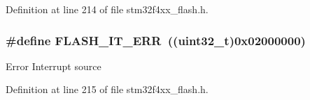 Definition at line 214 of file stm32f4xx\-\_\-flash.\-h.

\hypertarget{group___f_l_a_s_h___interrupts_ga4e2c23ab8c1b9a5ee49bf6d695d9ae8c}{
\subsubsection[{F\-L\-A\-S\-H\-\_\-\-I\-T\-\_\-\-E\-R\-R}]{\setlength{\rightskip}{0pt plus 5cm}\#define F\-L\-A\-S\-H\-\_\-\-I\-T\-\_\-\-E\-R\-R~((uint32\-\_\-t)0x02000000)}}\label{group___f_l_a_s_h___interrupts_ga4e2c23ab8c1b9a5ee49bf6d695d9ae8c}
Error Interrupt source 

Definition at line 215 of file stm32f4xx\-\_\-flash.\-h.

